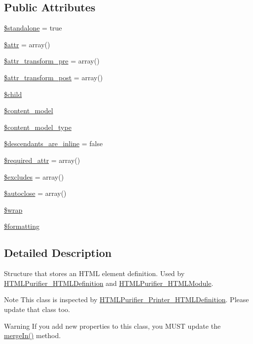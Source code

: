 \subsection*{Public Attributes}
\begin{DoxyCompactItemize}
\item 
\hyperlink{classHTMLPurifier__ElementDef_a55b9825b6bf0fcf1757d223fe67b2502}{\$standalone} = true
\item 
\hyperlink{classHTMLPurifier__ElementDef_a2bcbdb53248fe3df0ac956cde18f793f}{\$attr} = array()
\item 
\hyperlink{classHTMLPurifier__ElementDef_a8673e6a9b4eb86ebacdcc44a4eba2cad}{\$attr\+\_\+transform\+\_\+pre} = array()
\item 
\hyperlink{classHTMLPurifier__ElementDef_a3085ac6ae100475e1ff86fe94910c12e}{\$attr\+\_\+transform\+\_\+post} = array()
\item 
\hyperlink{classHTMLPurifier__ElementDef_ac00a01850d99ecacc0245d6ceba13a9b}{\$child}
\item 
\hyperlink{classHTMLPurifier__ElementDef_a629aecb03bfd09763b4f22d6153e845b}{\$content\+\_\+model}
\item 
\hyperlink{classHTMLPurifier__ElementDef_a0371f4fa7ff6a8fdd55aa949df833f38}{\$content\+\_\+model\+\_\+type}
\item 
\hyperlink{classHTMLPurifier__ElementDef_abb620edb77a4817b18aeed07343d002b}{\$descendants\+\_\+are\+\_\+inline} = false
\item 
\hyperlink{classHTMLPurifier__ElementDef_a5a3ba83e55d67a7e20ba6c80ea73aa54}{\$required\+\_\+attr} = array()
\item 
\hyperlink{classHTMLPurifier__ElementDef_a878b52c232dac0e65eec37048c47299f}{\$excludes} = array()
\item 
\hyperlink{classHTMLPurifier__ElementDef_a19729d4c2d69e9864a148d0a6b390a36}{\$autoclose} = array()
\item 
\hyperlink{classHTMLPurifier__ElementDef_a9d58b1db4bc6a4aa7bf4e6896ba3b932}{\$wrap}
\item 
\hyperlink{classHTMLPurifier__ElementDef_adb1a90d0ca1759f991e69b8e4a7758ce}{\$formatting}
\end{DoxyCompactItemize}


\subsection{Detailed Description}
Structure that stores an H\+T\+M\+L element definition. Used by \hyperlink{classHTMLPurifier__HTMLDefinition}{H\+T\+M\+L\+Purifier\+\_\+\+H\+T\+M\+L\+Definition} and \hyperlink{classHTMLPurifier__HTMLModule}{H\+T\+M\+L\+Purifier\+\_\+\+H\+T\+M\+L\+Module}. \begin{DoxyNote}{Note}
This class is inspected by \hyperlink{classHTMLPurifier__Printer__HTMLDefinition}{H\+T\+M\+L\+Purifier\+\_\+\+Printer\+\_\+\+H\+T\+M\+L\+Definition}. Please update that class too. 
\end{DoxyNote}
\begin{DoxyWarning}{Warning}
If you add new properties to this class, you M\+U\+S\+T update the \hyperlink{classHTMLPurifier__ElementDef_a1b64a7a4cebe332edc6f190a5ac9d84e}{merge\+In()} method. 
\end{DoxyWarning}


